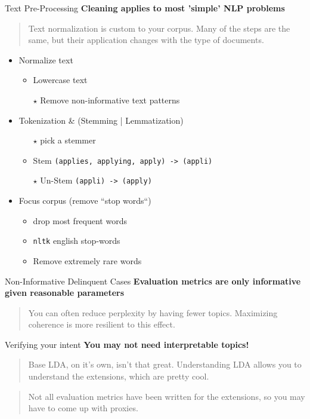 \documentclass[10pt]{beamer}
\begin{document}
\begin{frame}{Text Pre-Processing}
{\bf Cleaning applies to most 'simple' NLP problems}

\begin{quote}
  Text normalization is custom to your corpus. Many of the steps are the same, but their application changes with the type of documents.
\end{quote}

  \begin{itemize}
  \item Normalize text
    \begin{itemize}
    \item Lowercase text
    \item[$\star$] Remove non-informative text patterns
    \end{itemize}
  \item Tokenization \& (Stemming | Lemmatization)
    \begin{itemize}
    \item[$\star$] pick a stemmer
    \item Stem \hfill\texttt{(applies, applying, apply) -> (appli)}
    \item[$\star$] Un-Stem \hfill\texttt{(appli) -> (apply)}
    \end{itemize}
  \item Focus corpus (remove ``stop words``)
    \begin{itemize}
    \item drop most frequent words
    \item \texttt{nltk} english stop-words
    \item Remove extremely rare words
    \end{itemize}
  \end{itemize}

\end{frame}

\begin{frame}{Non-Informative Delinquent Cases}
  {\bf Evaluation metrics are only informative given reasonable parameters}

  \begin{quote}
    You can often reduce perplexity by having fewer topics.
    Maximizing coherence is more resilient to this effect.
  \end{quote}
\end{frame}

\begin{frame}{Verifying your intent}
  {\bf You may not need interpretable topics!}

  \begin{quote}
    Base LDA, on it's own, isn't that great. Understanding LDA allows you to understand the extensions, which are pretty cool.
  \end{quote}

  \vspace{2em}

  \begin{quote}
    Not all evaluation metrics have been written for the extensions, so you may have to come up with proxies.
  \end{quote}

\end{frame}
\end{document}
